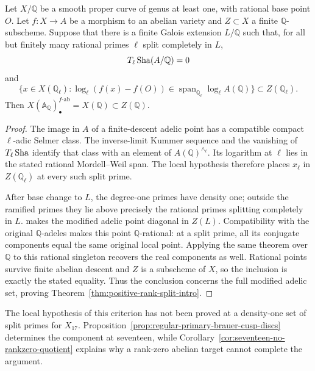\begin{proposition}
\label{prop:positive-rank-split-prime-criterion}
Let $X/\mathbb Q$ be a smooth proper curve of genus at least
one, with rational base point $O$.  Let $f:X\to A$ be a
morphism to an abelian variety and $Z\subset X$ a finite
$\mathbb Q$-subscheme.  Suppose that there is a finite
Galois extension $L/\mathbb Q$ such that, for all but finitely
many rational primes $\ell$ split completely in $L$,
\[
 T_\ell\operatorname{Sha}(A/\mathbb Q)=0
\]
and
\[
 \{x\in X(\mathbb Q_\ell):
   \log_\ell(f(x)-f(O))\in
   \operatorname{span}_{\mathbb Q_\ell}
                         \log_\ell A(\mathbb Q)\}
                 \subset Z(\mathbb Q_\ell).
\]
Then
$X(\mathbb A_{\mathbb Q})_\bullet^{f\text{-}\mathrm{ab}}
=X(\mathbb Q)\subset Z(\mathbb Q)$.
\end{proposition}
\begin{proof}
The image in $A$ of a finite-descent adelic point has a
compatible compact $\ell$-adic Selmer class.  The inverse-limit
Kummer sequence and the vanishing of $T_\ell\operatorname{Sha}$ identify
that class with an element of $A(\mathbb Q)^{\wedge_\ell}$.
Its logarithm at $\ell$ lies in the stated rational
Mordell--Weil span.  The local hypothesis therefore places
$x_\ell$ in $Z(\mathbb Q_\ell)$ at every such split prime.

After base change to $L$, the degree-one primes have density
one; outside the ramified primes they lie above precisely
the rational primes splitting completely in $L$.
\citet[Theorem~8.2, pp.~383--384]{Stoll2007} makes the
modified adelic point diagonal in $Z(L)$.  Compatibility
with the original $\mathbb Q$-adeles makes this point
$\mathbb Q$-rational: at a split prime, all its conjugate
components equal the same original local point.
Applying the same theorem over $\mathbb Q$ to this rational
singleton recovers the real components as well. Rational points
survive finite abelian descent and $Z$ is a subscheme of $X$, so
the inclusion is exactly the stated equality. Thus the conclusion
concerns the full modified adelic set, proving
Theorem~\ref{thm:positive-rank-split-intro}.
\end{proof}

The local hypothesis of this criterion has not been proved
at a density-one set of split primes for $X_{17}$.
Proposition~\ref{prop:regular-primary-brauer-cusp-discs} determines
the component at seventeen, while
Corollary~\ref{cor:seventeen-no-rankzero-quotient} explains
why a rank-zero abelian target cannot complete the argument.
